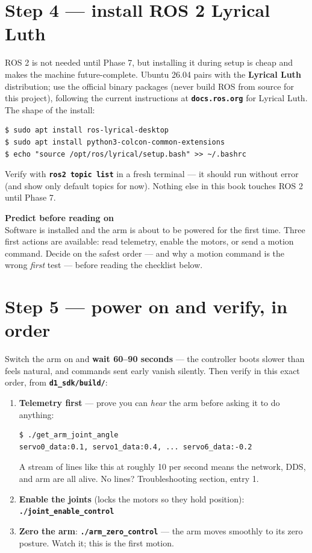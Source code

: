 \documentclass[11pt,twoside,openright]{book}
\newcommand{\code}[1]{\texttt{\bfseries #1}}
\newenvironment{pktpredict}{\begin{pktpredictbox}\textbf{\color{accentorange}Predict before reading on}\\[4pt]}{\end{pktpredictbox}}
\begin{document}
\section{Step 4 --- install ROS 2 Lyrical Luth}

ROS 2 is not needed until Phase 7, but installing it during setup is
cheap and makes the machine future-complete. Ubuntu 26.04 pairs with the
\textbf{Lyrical Luth} distribution; use the official binary packages
(never build ROS from source for this project), following the current
instructions at \code{docs.ros.org} for Lyrical Luth. The shape of the
install:

\begin{lstlisting}
$ sudo apt install ros-lyrical-desktop
$ sudo apt install python3-colcon-common-extensions
$ echo "source /opt/ros/lyrical/setup.bash" >> ~/.bashrc
\end{lstlisting}

Verify with \code{ros2 topic list} in a fresh terminal --- it should run
without error (and show only default topics for now). Nothing else in
this book touches ROS 2 until Phase 7.

\begin{pktpredict}
Software is installed and the arm is about to be powered for the first
time. Three first actions are available: read telemetry, enable the
motors, or send a motion command. Decide on the safest order --- and why
a motion command is the wrong \emph{first} test --- before reading the
checklist below.
\end{pktpredict}

\section{Step 5 --- power on and verify, in order}

Switch the arm on and \textbf{wait 60--90 seconds} --- the controller
boots slower than feels natural, and commands sent early vanish silently.
Then verify in this exact order, from \code{d1\_sdk/build/}:

\begin{enumerate}
  \item \textbf{Telemetry first} --- prove you can \emph{hear} the arm
    before asking it to do anything:
\begin{lstlisting}
$ ./get_arm_joint_angle
servo0_data:0.1, servo1_data:0.4, ... servo6_data:-0.2
\end{lstlisting}
    A stream of lines like this at roughly 10 per second means the
    network, DDS, and arm are all alive. No lines? Troubleshooting
    section, entry 1.
  \item \textbf{Enable the joints} (locks the motors so they hold
    position): \code{./joint\_enable\_control}
  \item \textbf{Zero the arm}: \code{./arm\_zero\_control} --- the arm
    moves smoothly to its zero posture. Watch it; this is the first
    motion.
\end{enumerate}
\end{document}

